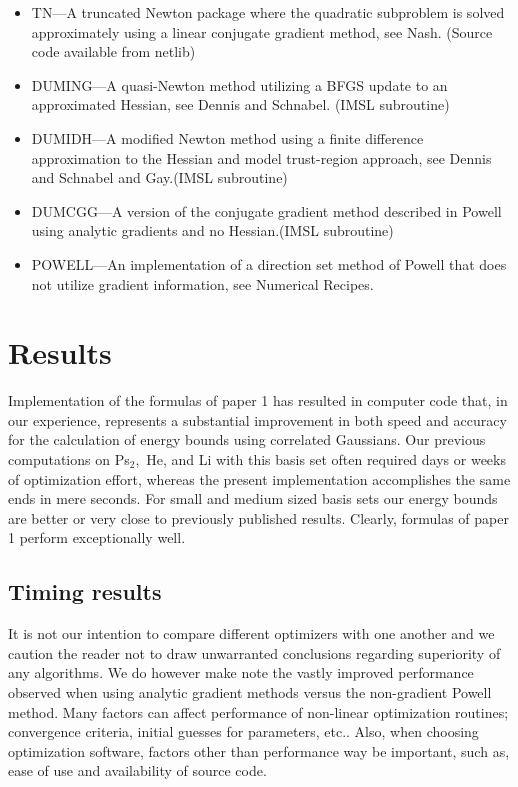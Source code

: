 \documentclass[12pt,thmsa]{article}
\begin{document}
\begin{itemize}
\item  TN---A truncated Newton package where the quadratic subproblem is
solved approximately using a linear conjugate gradient method, see Nash\cite
{NashTN}. (Source code available from netlib\cite{netlib})

\item  DUMING---A quasi-Newton method utilizing a BFGS update to an
approximated Hessian, see Dennis and Schnabel\cite{DennisSchnabel83}. (IMSL
subroutine)

\item  DUMIDH---A modified Newton method using a finite difference
approximation to the Hessian and model trust-region approach, see Dennis and
Schnabel\cite{DennisSchnabel83} and Gay\cite{Gay83}.(IMSL subroutine)

\item  DUMCGG---A version of the conjugate gradient method described in
Powell\cite{Powell77} using analytic gradients and no Hessian.(IMSL
subroutine)

\item  POWELL---An implementation of a direction set method of Powell that
does not utilize gradient information, see Numerical Recipes\cite
{NRinFortran}.
\end{itemize}

\section{Results}

Implementation of the formulas of paper 1 has resulted in computer code
that, in our experience, represents a substantial improvement in both speed
and accuracy for the calculation of energy bounds using correlated
Gaussians. Our previous computations on Ps$_2,$ He, and Li with this basis
set often required days or weeks of optimization effort, whereas the present
implementation accomplishes the same ends in mere seconds. For small and
medium sized basis sets our energy bounds are better or very close to
previously published results. Clearly, formulas of paper 1 perform
exceptionally well.

\subsection{Timing results}

It is not our intention to compare different optimizers with one another and
we caution the reader not to draw unwarranted conclusions regarding
superiority of any algorithms. We do however make note the vastly improved
performance observed when using analytic gradient methods versus the
non-gradient Powell method. Many factors can affect performance of
non-linear optimization routines; convergence criteria, initial guesses for
parameters, etc.. Also, when choosing optimization software, factors other
than performance way be important, such as, ease of use and availability of
source code.
\end{document}
